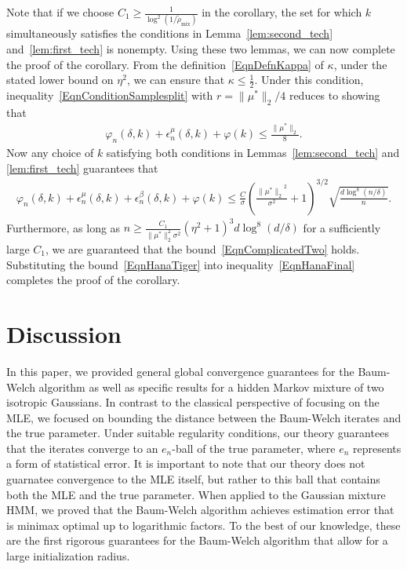 \documentclass[twoside,11pt]{article}
\newcommand{\numobs}{\ensuremath{n}}
\newcommand{\usedim}{\ensuremath{d}}
\newcommand{\norm}[1]{\ensuremath{\|#1\|_2}}
\newcommand{\subsize}{\numobs} %
\newcommand{\mixcoefeff}{\ensuremath{\widetilde{\rho}_{\mathrm{mix}}}}
\newcommand{\epsilonobs}{\epsilon^\paramobs}
\newcommand{\epsilontrans}{\epsilon^\paramtrans}
\newcommand{\paramobs}{\mu}
\newcommand{\trueparamobs}{\ensuremath{\paramobs^*}}
\newcommand{\paramtrans}{\beta}
\newcommand{\SNR}{\eta^2}
\newcommand{\kdim}{\ensuremath{k}}
\newcommand{\BOUNDFUN}{\ensuremath{\varphi}}
\newcommand{\mustar}{\ensuremath{\mu^*}}
\newcommand{\BIGCON}{\ensuremath{C}}
\newcommand{\minimaxrad}{\ensuremath{e_\numobs}}
\begin{document}
Note that if we choose $\BIGCON_1  \geq \frac{1}{\log^2(1/\mixcoefeff)}$ in the corollary,
the set for which $\kdim$ simultaneously satisfies the conditions
in Lemma~\ref{lem:second_tech} and~\ref{lem:first_tech} is nonempty. 
Using these two lemmas, we can now complete the proof of the
corollary.  From the definition~\eqref{EqnDefnKappa} of $\kappa$,
under the stated lower bound on $\SNR$, we can ensure that $\kappa \leq \frac{1}{2}$.
Under this condition, inequality~\eqref{EqnConditionSamplesplit} with \mbox{$r
  = \|\mustar\|_2/4$} reduces to showing that
\begin{align}
\label{EqnComplicatedTwo}
\BOUNDFUN_{\subsize}(\delta, \kdim) + \epsilonobs_{\subsize}
(\delta, \kdim) + \BOUNDFUN (\kdim) \leq 
\frac{\|\trueparamobs\|_2}{8}. %
\end{align}
Now any choice of $k$  satisfying both conditions in
Lemmas~\ref{lem:second_tech} and \ref{lem:first_tech} guarantees that
\begin{align}
\label{EqnHanaTiger}
\varphi_{\subsize} (\delta, \kdim) + \epsilonobs_{\subsize} (\delta,
\kdim) + \epsilontrans_{\subsize} (\delta, \kdim) + \BOUNDFUN(\kdim)
\leq \frac{C}{\sigma}(\frac{\norm{\trueparamobs}^2}{\sigma^2}+1)^{3/2}  \sqrt{\frac{ d
    \log^8 (\numobs/\delta)}{\numobs}}.
\end{align}
Furthermore, as long as $\numobs \geq \frac{\BIGCON_1}{\|\trueparamobs\|_2^2\sigma^2} 
(\SNR+1)^3  \usedim \log^8(  \usedim/\delta)$ for a sufficiently large
$\BIGCON_1$, we are guaranteed that the
bound~\eqref{EqnComplicatedTwo} holds. 
Substituting the bound~\eqref{EqnHanaTiger} into
inequality~\eqref{EqnHanaFinal} completes the proof of the corollary.





\section{Discussion}

In this paper, we provided general global convergence guarantees for
the Baum-Welch algorithm as well as specific results for a hidden
Markov mixture of two isotropic Gaussians.  In contrast to the
classical perspective of focusing on the MLE, we focused on bounding
the distance between the Baum-Welch iterates and the true parameter.
Under suitable regularity conditions, our theory guarantees that the
iterates converge to an $\minimaxrad$-ball of the true parameter,
where $\minimaxrad$ represents a form of statistical error.  It
is important to note that our theory does not guarnatee convergence to
the MLE itself, but rather to this ball that contains both the MLE and
the true parameter.  When applied to the Gaussian mixture HMM, we
proved that the Baum-Welch algorithm achieves estimation error that is minimax
optimal up to logarithmic factors.  To the best of our knowledge,
these are the first rigorous guarantees for the Baum-Welch algorithm
that allow for a large initialization radius.
\end{document}
